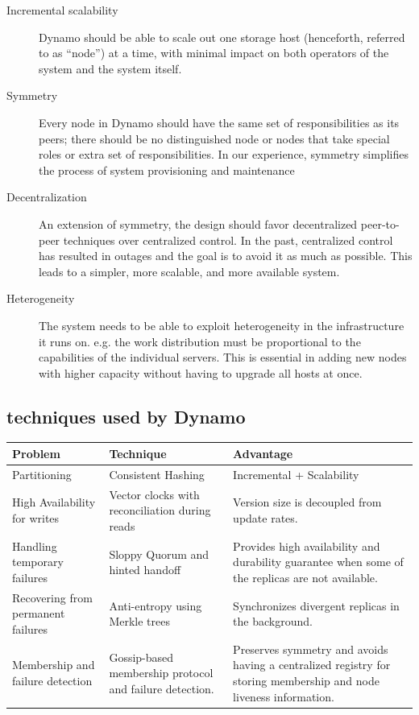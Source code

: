 \begin{description}
\item[Incremental scalability] Dynamo should be able to scale out one
storage host (henceforth, referred to as “node”) at a time, with
minimal impact on both operators of the system and the system
itself.

\item[Symmetry] Every node in Dynamo should have the same set of
responsibilities as its peers; there should be no distinguished node
or nodes that take special roles or extra set of responsibilities. In
our experience, symmetry simplifies the process of system
provisioning and maintenance

\item[Decentralization] An extension of symmetry, the design should
favor decentralized peer-to-peer techniques over centralized
control. In the past, centralized control has resulted in outages and
the goal is to avoid it as much as possible. This leads to a simpler,
more scalable, and more available system.

\item[Heterogeneity] The system needs to be able to exploit
heterogeneity in the infrastructure it runs on. e.g. the work
distribution must be proportional to the capabilities of the
individual servers. This is essential in adding new nodes with
higher capacity without having to upgrade all hosts at once.

\end{description}

\subsection{techniques used by Dynamo}

\begin{tabular}{p{4.5cm}|p{4.5cm}|p{4.5cm}}
Problem & Technique & Advantage \\
\hline
\hline
Partitioning & Consistent Hashing  & Incremental + Scalability \\
\hline
High Availability for writes  & Vector clocks with reconciliation during reads & Version size is decoupled from update rates. \\  
\hline
Handling temporary
failures  & Sloppy Quorum and
hinted handoff & Provides high
availability and
durability guarantee
when some of the
replicas are not
available.  \\
\hline
Recovering from
permanent failures & Anti-entropy using
Merkle trees & Synchronizes
divergent replicas in
the background. \\
\hline
Membership and
failure detection  & Gossip-based
membership protocol
and failure detection. & Preserves symmetry
and avoids having a
centralized registry
for storing
membership and
node liveness
information. \\
\hline 
\end{tabular}

